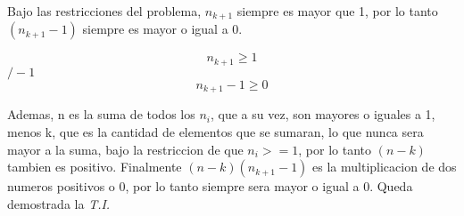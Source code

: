 \documentclass[../doc.tex]{subfiles}
\begin{document}
Bajo las restricciones del problema, $ n_{k+1} $ siempre es mayor que 1, por lo 
tanto $ (n_{k+1}-1) $ siempre es mayor o igual a 0. 

\[ n_{k+1} \geq 1 \]
\hspace*{0pt}\hfill $/ -1 $
\[ n_{k+1} - 1 \geq 0 \]

Ademas, n es la suma de todos los $ n_{i} $, que a su vez, son mayores o iguales
a 1, menos k, que es la cantidad de elementos que se sumaran, lo que nunca sera mayor a la suma, 
bajo la restriccion de que  $ n_{i} >= 1 $, por lo tanto $ (n-k) $ tambien es 
positivo. Finalmente $ (n-k)( n_{k+1}-1) $ es la multiplicacion de dos numeros
positivos o 0, por lo tanto siempre sera mayor o igual a 0. Queda demostrada 
la \emph{T.I.}
\end{document}
